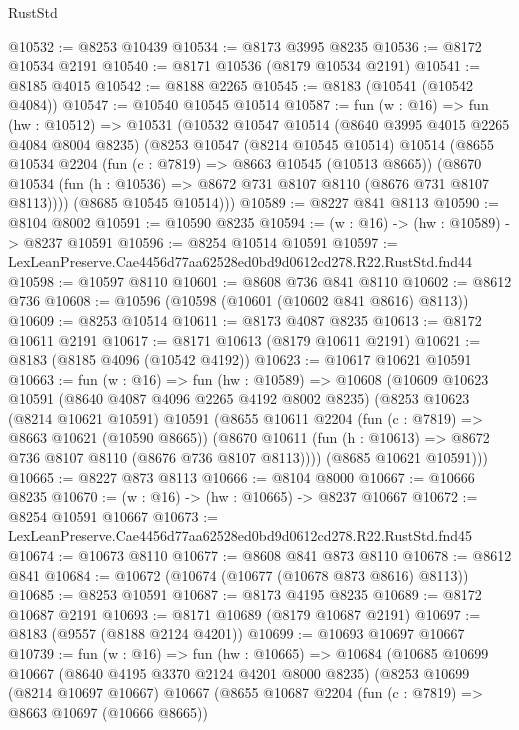 \begin{lexlean}{RustStd}
\begin{coremodule}
@10532 := @8253 @10439
@10534 := @8173 @3995 @8235
@10536 := @8172 @10534 @2191
@10540 := @8171 @10536 (@8179 @10534 @2191)
@10541 := @8185 @4015
@10542 := @8188 @2265
@10545 := @8183 (@10541 (@10542 @4084))
@10547 := @10540 @10545 @10514
@10587 := fun (w : @16) =>
  fun (hw : @10512) =>
  @10531
    (@10532
      @10547
      @10514
      (@8640 @3995 @4015 @2265 @4084 @8004 @8235)
      (@8253
        @10547
        (@8214 @10545 @10514)
        @10514
        (@8655
          @10534
          @2204
          (fun (c : @7819) => @8663 @10545 (@10513 @8665))
          (@8670 @10534 (fun (h : @10536) => @8672 @731 @8107 @8110 (@8676 @731 @8107 @8113))))
        (@8685 @10545 @10514)))
@10589 := @8227 @841 @8113
@10590 := @8104 @8002
@10591 := @10590 @8235
@10594 := (w : @16) -> (hw : @10589) -> @8237 @10591
@10596 := @8254 @10514 @10591
@10597 := LexLeanPreserve.Cae4456d77aa62528ed0bd9d0612cd278.R22.RustStd.fnd44
@10598 := @10597 @8110
@10601 := @8608 @736 @841 @8110
@10602 := @8612 @736
@10608 := @10596 (@10598 (@10601 (@10602 @841 @8616) @8113))
@10609 := @8253 @10514
@10611 := @8173 @4087 @8235
@10613 := @8172 @10611 @2191
@10617 := @8171 @10613 (@8179 @10611 @2191)
@10621 := @8183 (@8185 @4096 (@10542 @4192))
@10623 := @10617 @10621 @10591
@10663 := fun (w : @16) =>
  fun (hw : @10589) =>
  @10608
    (@10609
      @10623
      @10591
      (@8640 @4087 @4096 @2265 @4192 @8002 @8235)
      (@8253
        @10623
        (@8214 @10621 @10591)
        @10591
        (@8655
          @10611
          @2204
          (fun (c : @7819) => @8663 @10621 (@10590 @8665))
          (@8670 @10611 (fun (h : @10613) => @8672 @736 @8107 @8110 (@8676 @736 @8107 @8113))))
        (@8685 @10621 @10591)))
@10665 := @8227 @873 @8113
@10666 := @8104 @8000
@10667 := @10666 @8235
@10670 := (w : @16) -> (hw : @10665) -> @8237 @10667
@10672 := @8254 @10591 @10667
@10673 := LexLeanPreserve.Cae4456d77aa62528ed0bd9d0612cd278.R22.RustStd.fnd45
@10674 := @10673 @8110
@10677 := @8608 @841 @873 @8110
@10678 := @8612 @841
@10684 := @10672 (@10674 (@10677 (@10678 @873 @8616) @8113))
@10685 := @8253 @10591
@10687 := @8173 @4195 @8235
@10689 := @8172 @10687 @2191
@10693 := @8171 @10689 (@8179 @10687 @2191)
@10697 := @8183 (@9557 (@8188 @2124 @4201))
@10699 := @10693 @10697 @10667
@10739 := fun (w : @16) =>
  fun (hw : @10665) =>
  @10684
    (@10685
      @10699
      @10667
      (@8640 @4195 @3370 @2124 @4201 @8000 @8235)
      (@8253
        @10699
        (@8214 @10697 @10667)
        @10667
        (@8655
          @10687
          @2204
          (fun (c : @7819) => @8663 @10697 (@10666 @8665))

\end{coremodule}
\end{lexlean}
